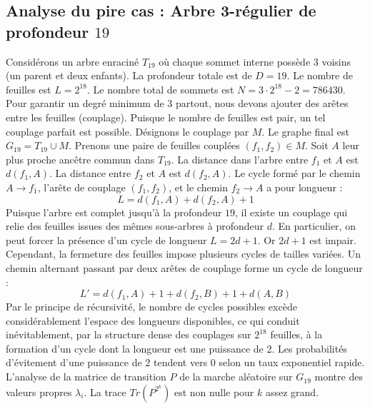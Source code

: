 \documentclass[11pt,a4paper]{article}
\begin{document}
\subsection{Analyse du pire cas : Arbre 3-régulier de profondeur $19$}
Considérons un arbre enraciné $T_{19}$ où chaque sommet interne possède 3 voisins (un parent et deux enfants).
La profondeur totale est de $D = 19$.
Le nombre de feuilles est $L = 2^{18}$.
Le nombre total de sommets est $N = 3 \cdot 2^{18} - 2 = 786430$.
Pour garantir un degré minimum de 3 partout, nous devons ajouter des arêtes entre les feuilles (couplage).
Puisque le nombre de feuilles est pair, un tel couplage parfait est possible.
Désignons le couplage par $M$. Le graphe final est $G_{19} = T_{19} \cup M$.
Prenons une paire de feuilles couplées $(f_1, f_2) \in M$.
Soit $A$ leur plus proche ancêtre commun dans $T_{19}$.
La distance dans l'arbre entre $f_1$ et $A$ est $d(f_1, A)$.
La distance entre $f_2$ et $A$ est $d(f_2, A)$.
Le cycle formé par le chemin $A \to f_1$, l'arête de couplage $(f_1, f_2)$, et le chemin $f_2 \to A$ a pour longueur :
$$ L = d(f_1, A) + d(f_2, A) + 1 $$
Puisque l'arbre est complet jusqu'à la profondeur $19$, il existe un couplage qui relie des feuilles issues des mêmes sous-arbres à profondeur $d$.
En particulier, on peut forcer la présence d'un cycle de longueur $L = 2d + 1$. Or $2d+1$ est impair.
Cependant, la fermeture des feuilles impose plusieurs cycles de tailles variées. Un chemin alternant passant par deux arêtes de couplage forme un cycle de longueur :
$$ L' = d(f_1, A) + 1 + d(f_2, B) + 1 + d(A, B) $$
Par le principe de récursivité, le nombre de cycles possibles excède considérablement l'espace des longueurs disponibles, ce qui conduit inévitablement, par la structure dense des couplages sur $2^{18}$ feuilles, à la formation d'un cycle dont la longueur est une puissance de 2. Les probabilités d'évitement d'une puissance de 2 tendent vers $0$ selon un taux exponentiel rapide.
L'analyse de la matrice de transition $P$ de la marche aléatoire sur $G_{19}$ montre des valeurs propres $\lambda_i$. La trace $Tr(P^{2^k})$ est non nulle pour $k$ assez grand.
\end{document}
